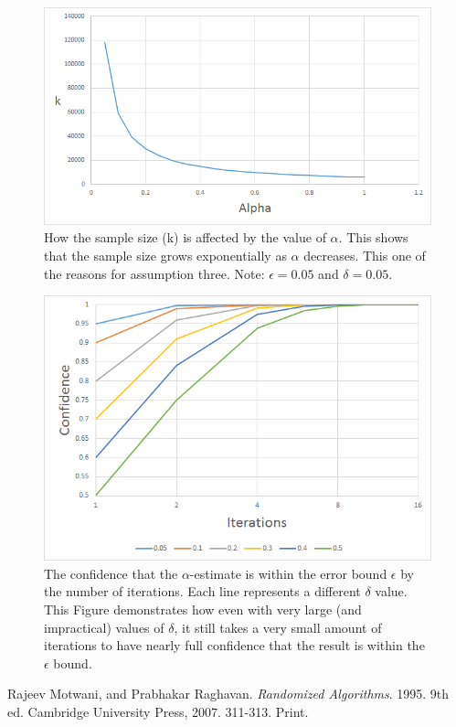 \documentclass[11pt]{article}
\begin{document}
\newpage
\begin{appendices}

\begin{figure}[h!]
	\centering
	\includegraphics[width=0.7\linewidth]{fig1.png}
	\caption{How the sample size (k) is affected by the value of $\alpha$.		
		This shows that the sample size grows exponentially as $\alpha$ decreases. This one of the reasons for assumption three.
		Note: $\epsilon=0.05$ and $\delta=0.05$.}
\end{figure}

\begin{figure}[h!]
	\centering
	\includegraphics[width=0.7\linewidth]{fig2.png}
	\caption{The confidence that the $\alpha$-estimate is within the error bound $\epsilon$ by the number of iterations. Each line represents a different $\delta$ value. This Figure demonstrates how even with very large (and impractical) values of $\delta$, it still takes a very small amount of iterations to have nearly full confidence that the result is within the $\epsilon$ bound.}
\end{figure}
\end{appendices}

\newpage
{}
\begin{thebibliography}{2}

Rajeev Motwani, and Prabhakar Raghavan.
\textit{Randomized Algorithms}. 1995. 9th ed.
Cambridge University Press, 2007.
311-313. Print.

\end{thebibliography}
\end{document}
